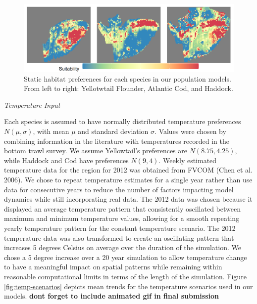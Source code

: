 \documentclass[
  12pt,
]{article}
\begin{document}
\begin{figure}

{\centering \includegraphics[width=0.95\linewidth]{Images/Habitat_3species} 

}

\caption{Static habitat preferences for each species in our population models. From left to right: Yellotwtail Flounder, Atlantic Cod, and Haddock.}\label{fig:hab-plot}
\end{figure}

\emph{Temperature Input}

Each species is assumed to have normally distributed temperature preferences \(N(\mu,\sigma)\), with mean \(\mu\) and standard deviation \(\sigma\). Values were chosen by combining information in the literature with temperatures recorded in the bottom trawl survey. We assume Yellowtail's preferences are \(N(8.75,4.25)\), while Haddock and Cod have preferences \(N(9,4)\). Weekly estimated temperature data for the region for 2012 was obtained from FVCOM (Chen et al. 2006). We chose to repeat temperature estimates for a single year rather than use data for consecutive years to reduce the number of factors impacting model dynamics while still incorporating real data. The 2012 data was chosen because it displayed an average temperature pattern that consistently oscillated between maximum and minimum temperature values, allowing for a smooth repeating yearly temperature pattern for the constant temperature scenario. The 2012 temperature data was also transformed to create an oscillating pattern that increases 5 degrees Celsius on average over the duration of the simulation. We chose a 5 degree increase over a 20 year simulation to allow temperature change to have a meaningful impact on spatial patterns while remaining within reasonable computational limits in terms of the length of the simulation. Figure \ref{fig:temp-scenarios} depicts mean trends for the temperature scenarios used in our models. \textbf{dont forget to include animated gif in final submission}
\end{document}
